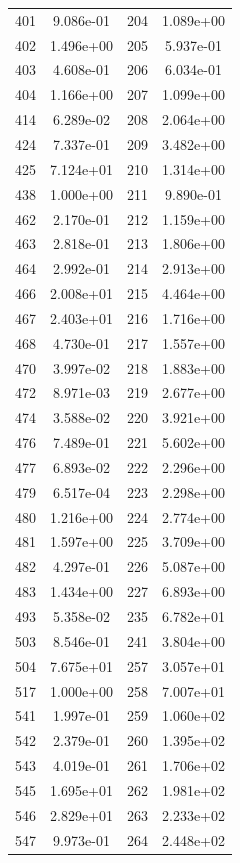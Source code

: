 \documentclass[12pt]{article}
\begin{document}
\begin{longtable}{@{}cccc@{}}
401 & 9.086e-01 & 204 & 1.089e+00 \\
402 & 1.496e+00 & 205 & 5.937e-01 \\
403 & 4.608e-01 & 206 & 6.034e-01 \\
404 & 1.166e+00 & 207 & 1.099e+00 \\
414 & 6.289e-02 & 208 & 2.064e+00 \\
424 & 7.337e-01 & 209 & 3.482e+00 \\
425 & 7.124e+01 & 210 & 1.314e+00 \\
438 & 1.000e+00 & 211 & 9.890e-01 \\
462 & 2.170e-01 & 212 & 1.159e+00 \\
463 & 2.818e-01 & 213 & 1.806e+00 \\
464 & 2.992e-01 & 214 & 2.913e+00 \\
466 & 2.008e+01 & 215 & 4.464e+00 \\
467 & 2.403e+01 & 216 & 1.716e+00 \\
468 & 4.730e-01 & 217 & 1.557e+00 \\
470 & 3.997e-02 & 218 & 1.883e+00 \\
472 & 8.971e-03 & 219 & 2.677e+00 \\
474 & 3.588e-02 & 220 & 3.921e+00 \\
476 & 7.489e-01 & 221 & 5.602e+00 \\
477 & 6.893e-02 & 222 & 2.296e+00 \\
479 & 6.517e-04 & 223 & 2.298e+00 \\
480 & 1.216e+00 & 224 & 2.774e+00 \\
481 & 1.597e+00 & 225 & 3.709e+00 \\
482 & 4.297e-01 & 226 & 5.087e+00 \\
483 & 1.434e+00 & 227 & 6.893e+00 \\
493 & 5.358e-02 & 235 & 6.782e+01 \\
503 & 8.546e-01 & 241 & 3.804e+00 \\
504 & 7.675e+01 & 257 & 3.057e+01 \\
517 & 1.000e+00 & 258 & 7.007e+01 \\
541 & 1.997e-01 & 259 & 1.060e+02 \\
542 & 2.379e-01 & 260 & 1.395e+02 \\
543 & 4.019e-01 & 261 & 1.706e+02 \\
545 & 1.695e+01 & 262 & 1.981e+02 \\
546 & 2.829e+01 & 263 & 2.233e+02 \\
547 & 9.973e-01 & 264 & 2.448e+02 \\

\end{longtable}
\end{document}
